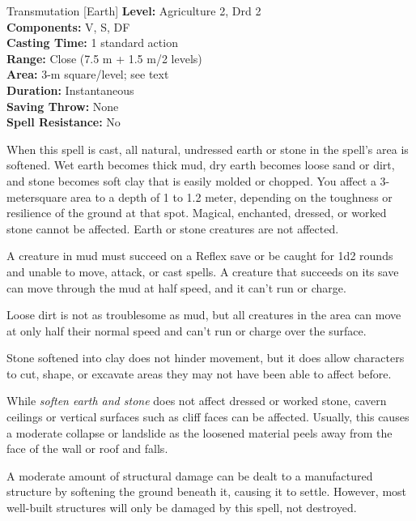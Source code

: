 {Transmutation [Earth]}
{
	\textbf{Level:}
	Agriculture 2, Drd 2\\
	\textbf{Components:}
	V, S, DF\\
	\textbf{Casting Time:}
	1 standard action\\
	\textbf{Range:}
	Close (7.5 m + 1.5 m/2 levels)\\
	\textbf{Area:}
	3-m square/level; see text\\
	\textbf{Duration:}
	Instantaneous\\
	\textbf{Saving Throw:}
	None\\
	\textbf{Spell Resistance:}
	No\\
}
{
	When this spell is cast, all natural, undressed earth or stone in the spell's area is softened. Wet earth becomes thick mud, dry earth becomes loose sand or dirt, and stone becomes soft clay that is easily molded or chopped. You affect a 3-metersquare area to a depth of 1 to 1.2 meter, depending on the toughness or resilience of the ground at that spot. Magical, enchanted, dressed, or worked stone cannot be affected. Earth or stone creatures are not affected.

	A creature in mud must succeed on a Reflex save or be caught for 1d2 rounds and unable to move, attack, or cast spells. A creature that succeeds on its save can move through the mud at half speed, and it can't run or charge.

	Loose dirt is not as troublesome as mud, but all creatures in the area can move at only half their normal speed and can't run or charge over the surface.

	Stone softened into clay does not hinder movement, but it does allow characters to cut, shape, or excavate areas they may not have been able to affect before.

	While \emph{soften earth and stone} does not affect dressed or worked stone, cavern ceilings or vertical surfaces such as cliff faces can be affected. Usually, this causes a moderate collapse or landslide as the loosened material peels away from the face of the wall or roof and falls.

	A moderate amount of structural damage can be dealt to a manufactured structure by softening the ground beneath it, causing it to settle. However, most well-built structures will only be damaged by this spell, not destroyed.

}
